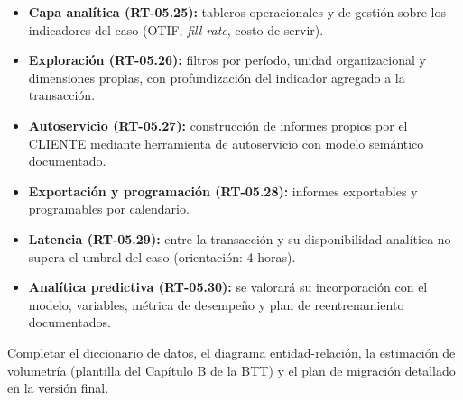 \begin{itemize}
  \item \textbf{Capa analítica (RT-05.25):} tableros operacionales y de gestión sobre los
        indicadores del caso (OTIF, \emph{fill rate}, costo de servir).
  \item \textbf{Exploración (RT-05.26):} filtros por período, unidad organizacional y
        dimensiones propias, con profundización del indicador agregado a la transacción.
  \item \textbf{Autoservicio (RT-05.27):} construcción de informes propios por el CLIENTE
        mediante herramienta de autoservicio con modelo semántico documentado.
  \item \textbf{Exportación y programación (RT-05.28):} informes exportables y
        programables por calendario.
  \item \textbf{Latencia (RT-05.29):} entre la transacción y su disponibilidad analítica
        no supera el umbral del caso (orientación: 4 horas).
  \item \textbf{Analítica predictiva (RT-05.30):} se valorará su incorporación con el
        modelo, variables, métrica de desempeño y plan de reentrenamiento documentados.
\end{itemize}

\vspace{4pt}
{\small\color{lafroxGrato}\pendiente{} Completar el diccionario de datos, el diagrama
entidad-relación, la estimación de volumetría (plantilla del Capítulo B de la BTT) y el
plan de migración detallado en la versión final.}
